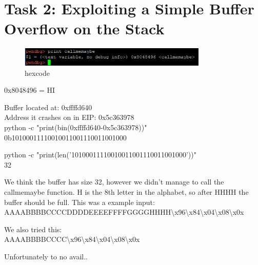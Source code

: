 \section{Task 2: Exploiting a Simple Buffer Overflow on the Stack}

\begin{figure}[H]
	\centering
	\includegraphics[width=0.8\textwidth]{Assignment0x02/image/print_callmemaybe}
	\caption{hexcode} \label{img:callme}
\end{figure}

0x8048496 = HI

Buffer located at: 0xffffd640\\
Address it crashes on in EIP: 0x5c363978\\

python -c "print(bin(0xffffd640-0x5c363978))"\\
0b10100011110010011001110011001000

python -c "print(len('10100011110010011001110011001000'))"\\
32

We think the buffer has size 32, however we didn't manage to call the callmemaybe function. H is the 8th letter in the alphabet, so after HHHH the buffer should be full.
This was a example input: \\
AAAABBBBCCCCDDDDEEEEFFFFGGGGHHHH\textbackslash x96\textbackslash x84\textbackslash x04\textbackslash x08\textbackslash x0x

We also tried this: \\
AAAABBBBCCCC\textbackslash x96\textbackslash x84\textbackslash x04\textbackslash x08\textbackslash x0x

Unfortunately to no avail..